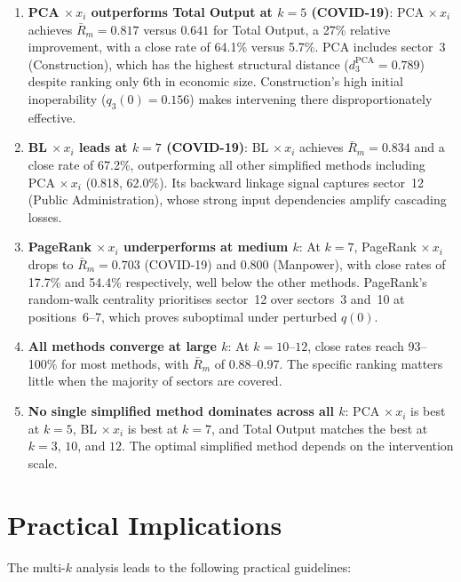 \begin{enumerate}
    \item \textbf{PCA $\times\, x_i$ outperforms Total Output at $k = 5$ (COVID-19)}: PCA $\times\, x_i$ achieves $\bar{R}_m = 0.817$ versus $0.641$ for Total Output, a 27\% relative improvement, with a close rate of 64.1\% versus 5.7\%. PCA includes sector~3 (Construction), which has the highest structural distance ($d_3^{\text{PCA}} = 0.789$) despite ranking only 6th in economic size. Construction's high initial inoperability ($q_3(0) = 0.156$) makes intervening there disproportionately effective.

    \item \textbf{BL $\times\, x_i$ leads at $k = 7$ (COVID-19)}: BL $\times\, x_i$ achieves $\bar{R}_m = 0.834$ and a close rate of 67.2\%, outperforming all other simplified methods including PCA $\times\, x_i$ (0.818, 62.0\%). Its backward linkage signal captures sector~12 (Public Administration), whose strong input dependencies amplify cascading losses.

    \item \textbf{PageRank $\times\, x_i$ underperforms at medium $k$}: At $k = 7$, PageRank $\times\, x_i$ drops to $\bar{R}_m = 0.703$ (COVID-19) and $0.800$ (Manpower), with close rates of 17.7\% and 54.4\% respectively, well below the other methods. PageRank's random-walk centrality prioritises sector~12 over sectors~3 and~10 at positions~6--7, which proves suboptimal under perturbed $q(0)$.

    \item \textbf{All methods converge at large $k$}: At $k = 10$--$12$, close rates reach 93--100\% for most methods, with $\bar{R}_m$ of 0.88--0.97. The specific ranking matters little when the majority of sectors are covered.

    \item \textbf{No single simplified method dominates across all $k$}: PCA $\times\, x_i$ is best at $k = 5$, BL $\times\, x_i$ is best at $k = 7$, and Total Output matches the best at $k = 3$, $10$, and $12$. The optimal simplified method depends on the intervention scale.
\end{enumerate}


\section{Practical Implications}

The multi-$k$ analysis leads to the following practical guidelines:

